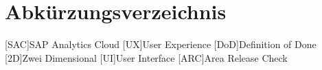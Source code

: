 \section*{Abkürzungsverzeichnis}
\begin{acronym}[AAAAAA]
    [SAC]{SAP Analytics Cloud}
    [UX]{User Experience} 
    [DoD]{Definition of Done}
    [2D]{Zwei Dimensional}
    [UI]{User Interface}
    [ARC]{Area Release Check}
\end{acronym}